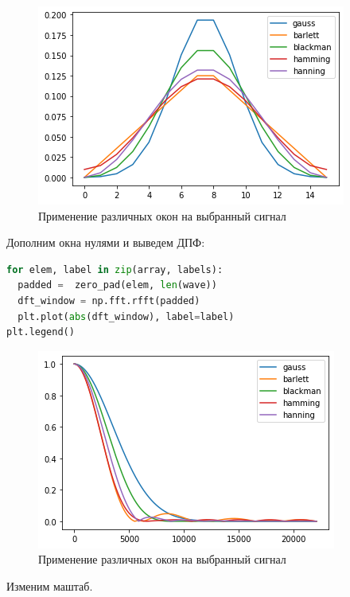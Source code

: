 \begin{figure}[H]
	\begin{center}
		\includegraphics[scale=1]{fig/lab08/lab08_8.png}
		\caption{Применение различных окон на выбранный сигнал}
	\end{center}
\end{figure}

Дополним окна нулями и выведем ДПФ:

\begin{lstlisting}[language=Python]
for elem, label in zip(array, labels):
  padded =  zero_pad(elem, len(wave))
  dft_window = np.fft.rfft(padded)
  plt.plot(abs(dft_window), label=label)
plt.legend()
\end{lstlisting}
\begin{figure}[H]
	\begin{center}
		\includegraphics[scale=1]{fig/lab08/lab08_9.png}
		\caption{Применение различных окон на выбранный сигнал}
	\end{center}
\end{figure}

Изменим маштаб.

